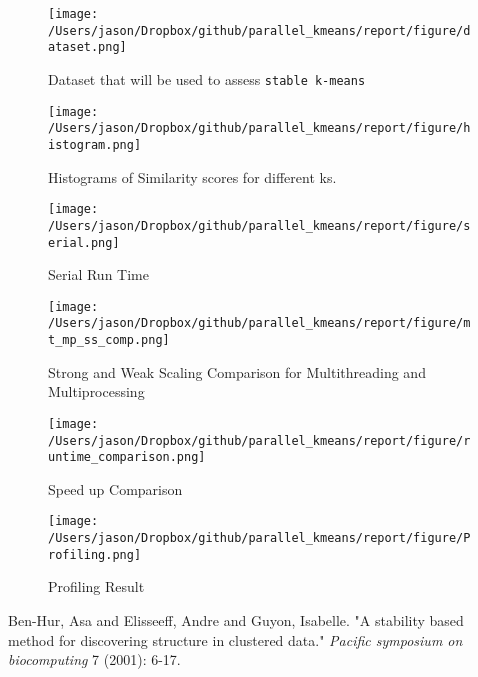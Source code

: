 \documentclass[a0paper,smallertitle]{HYposter}
\begin{document}
\begin{figure}[H] 
\texttt{[image: /Users/jason/Dropbox/github/parallel\_kmeans/report/figure/dataset.png]}
\caption{\label{fig:Dataset-that-will}Dataset that will be used to assess
\texttt{stable k-means}}
\end{figure}

\begin{figure}[H] 
\texttt{[image: /Users/jason/Dropbox/github/parallel\_kmeans/report/figure/histogram.png]}
\caption{\label{fig:Histograms-of-Similarity}Histograms of Similarity scores
for different ks.}
\end{figure}

\begin{figure}[H] 
\texttt{[image: /Users/jason/Dropbox/github/parallel\_kmeans/report/figure/serial.png]}
\caption{\label{fig:Serial-Run-Time}Serial Run Time}
\end{figure}


\begin{figure}[H] 
\texttt{[image: /Users/jason/Dropbox/github/parallel\_kmeans/report/figure/mt\_mp\_ss\_comp.png]} 
\caption{\label{fig:Strong-and-Weak}Strong and Weak Scaling Comparison for
Multithreading and Multiprocessing}
\end{figure}

\begin{figure}[H] 
\texttt{[image: /Users/jason/Dropbox/github/parallel\_kmeans/report/figure/runtime\_comparison.png]}
\caption{\label{fig:Speed-up-Comparison}Speed up Comparison}
\end{figure}

\begin{figure}[H] 
\texttt{[image: /Users/jason/Dropbox/github/parallel\_kmeans/report/figure/Profiling.png]}
\caption{\label{fig:Profiling} Profiling Result}
\end{figure}



\begin{small}
\begin{thebibliography}{5}
 Ben-Hur, Asa and Elisseeff, Andre and Guyon, Isabelle. "A stability based method for discovering structure in clustered data." \emph{Pacific symposium on biocomputing} 7 (2001): 6-17.
\end{thebibliography}
\end{small}
\end{document}
